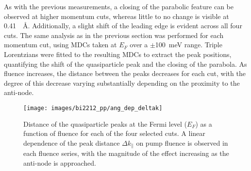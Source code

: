As with the previous measurements, a closing of the parabolic feature can be observed at higher momentum cuts, whereas little to no change is visible at \qty{0.41}{\per\angstrom}.
Additionally, a slight shift of the leading edge is evident across all four cuts.
The same analysis as in the previous section was performed for each momentum cut, using MDCs taken at $E_F$ over a $\pm$\qty{100}{\milli\electronvolt} range.
Triple Lorentzians were fitted to the resulting MDCs to extract the peak positions, quantifying the shift of the quasiparticle peak and the closing of the parabola.
As fluence increases, the distance between the peaks decreases for each cut, with the degree of this decrease varying substantially depending on the proximity to the anti-node.

\begin{figure}[th!]
	\centering
	\texttt{[image: images/bi2212\_pp/ang\_dep\_deltak]}
	\caption{Distance of the quasiparticle peaks at the Fermi level ($E_F$) as a function of fluence for each of the four selected cuts. A linear dependence of the peak distance $\Delta k_\parallel$ on pump fluence is observed in each fluence series, with the magnitude of the effect increasing as the anti-node is approached.}
	\label{fig:angdep_deltak}
\end{figure}


